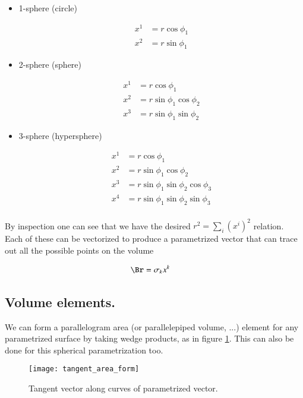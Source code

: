\begin{itemize}
\item 1-sphere (circle)

\begin{align*}
x^1 &= r \cos\phi_1 \\
x^2 &= r \sin\phi_1 
\end{align*}

\item 2-sphere (sphere)

\begin{align*}
x^1 &= r \cos\phi_1 \\
x^2 &= r \sin\phi_1 \cos\phi_2 \\
x^3 &= r \sin\phi_1 \sin\phi_2
\end{align*}

\item 3-sphere (hypersphere)

\begin{align*}
x^1 &= r \cos\phi_1 \\
x^2 &= r \sin\phi_1 \cos\phi_2 \\
x^3 &= r \sin\phi_1 \sin\phi_2 \cos\phi_3 \\
x^4 &= r \sin\phi_1 \sin\phi_2 \sin\phi_3 \\
\end{align*}

\end{itemize}

By inspection one can see that we have the desired $r^2 = \sum_i (x^i)^2$ relation.  Each of these can be vectorized to produce
a parametrized vector that can trace out all the possible points on the volume

\begin{align*}
\Br &= \sigma_k x^k 
\end{align*}

\subsection{Volume elements. }

We can form a parallelogram area (or parallelepiped volume, ...) element for any parametrized surface by taking wedge products, as in figure \ref{fig:tangent_area_form}.
This can also be done 
for this spherical parametrization too.

\begin{figure}[htp]
\centering
\texttt{[image: tangent\_area\_form]}
\caption{Tangent vector along curves of parametrized vector.}\label{fig:tangent_area_form}
\end{figure}

